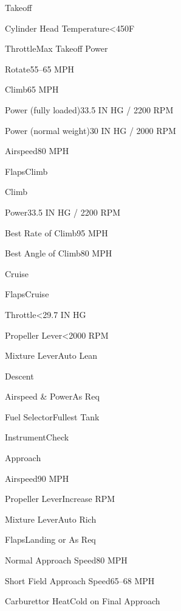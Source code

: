 \documentclass[sim-use]{checklist}
\begin{document}
\begin{checklist}{Takeoff}
  \item{Cylinder Head Temperature}{<450F}
  \item{Throttle}{Max Takeoff Power}
  \item{Rotate}{55--65 MPH}
  \item{Climb}{65 MPH}
   {
    \item{Power (fully loaded)}{33.5 IN HG / 2200 RPM}
    \item{Power (normal weight)}{30 IN HG / 2000 RPM}
    \item{Airspeed}{80 MPH}
  }
   {
    \item{Flaps}{Climb}
  }
\end{checklist}

\begin{checklist}{Climb}
   {
    \item{Power}{33.5 IN HG / 2200 RPM}
    \item{Best Rate of Climb}{95 MPH}
    \item{Best Angle of Climb}{80 MPH}
  }
\end{checklist}

\begin{checklist}{Cruise}
  \item{Flaps}{Cruise}
  \item{Throttle}{<29.7 IN HG}
  \item{Propeller Lever}{<2000 RPM}
  \item{Mixture Lever}{Auto Lean}
\end{checklist}

\begin{checklist}{Descent}
  \item{Airspeed \& Power}{As Req}
  \item{Fuel Selector}{Fullest Tank}
  \item{Instrument}{Check}
\end{checklist}

\begin{checklist}{Approach}
  \item{Airspeed}{90 MPH}
  \item{Propeller Lever}{Increase RPM}
  \item{Mixture Lever}{Auto Rich}
  \item{Flaps}{Landing or As Req}
  \item{Normal Approach Speed}{80 MPH}
  \item{Short Field Approach Speed}{65--68 MPH}
  \item{Carburettor Heat}{Cold on Final Approach}
\end{checklist}
\end{document}
